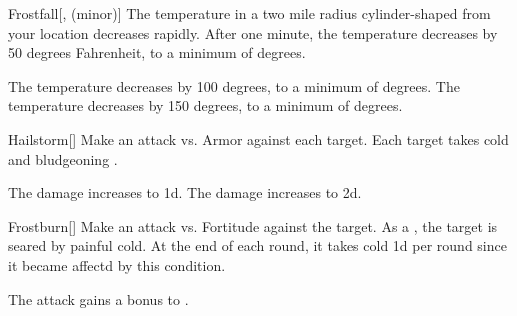 \lowercase{\hypertarget{spell:Frostfall}{}}\label{spell:Frostfall}
\begin{freeability}[Rank 4]{\hypertarget{spell:Frostfall}{Frostfall}}[,  (minor)]
\targetrule
The temperature in a two mile radius cylinder-shaped  from your location decreases rapidly.
After one minute, the temperature decreases by 50 degrees Fahrenheit, to a minimum of  degrees.

\rankline
{} The temperature decreases by 100 degrees, to a minimum of  degrees.
 The temperature decreases by 150 degrees, to a minimum of  degrees.
\end{freeability}
\vspace{0.25em}



\lowercase{\hypertarget{spell:Hailstorm}{}}\label{spell:Hailstorm}
\begin{freeability}[Rank 4]{\hypertarget{spell:Hailstorm}{Hailstorm}}[]
Make an attack vs. Armor against each target.
\hit Each target takes cold and bludgeoning .

\rankline
{} The damage increases to  \plus1d.
 The damage increases to  \plus2d.
\end{freeability}
\vspace{0.25em}



\lowercase{\hypertarget{spell:Frostburn}{}}\label{spell:Frostburn}
\begin{freeability}[Rank 6]{\hypertarget{spell:Frostburn}{Frostburn}}[]
Make an attack vs. Fortitude against the target.
\hit As a , the target is seared by painful cold.
At the end of each round, it takes cold  \minus1d per round since it became affectd by this condition.

 The attack gains a  bonus to .
\end{freeability}
\vspace{0.25em}


